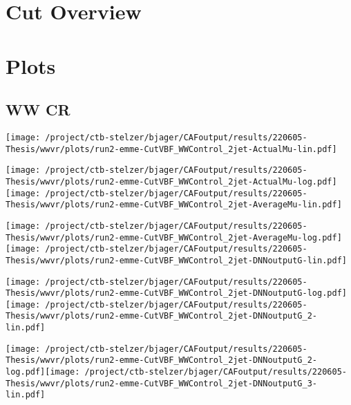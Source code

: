 \documentclass{article}
\begin{document}
\section[Cut Overview]{Cut Overview}

\centering


\section[Plots]{Plots}

\centering

\subsection[WW CR]{WW CR}

\centering

\texttt{[image: /project/ctb-stelzer/bjager/CAFoutput/results/220605-Thesis/wwvr/plots/run2-emme-CutVBF\_WWControl\_2jet-ActualMu-lin.pdf]}

\texttt{[image: /project/ctb-stelzer/bjager/CAFoutput/results/220605-Thesis/wwvr/plots/run2-emme-CutVBF\_WWControl\_2jet-ActualMu-log.pdf]}\texttt{[image: /project/ctb-stelzer/bjager/CAFoutput/results/220605-Thesis/wwvr/plots/run2-emme-CutVBF\_WWControl\_2jet-AverageMu-lin.pdf]}

\texttt{[image: /project/ctb-stelzer/bjager/CAFoutput/results/220605-Thesis/wwvr/plots/run2-emme-CutVBF\_WWControl\_2jet-AverageMu-log.pdf]}\texttt{[image: /project/ctb-stelzer/bjager/CAFoutput/results/220605-Thesis/wwvr/plots/run2-emme-CutVBF\_WWControl\_2jet-DNNoutputG-lin.pdf]}

\texttt{[image: /project/ctb-stelzer/bjager/CAFoutput/results/220605-Thesis/wwvr/plots/run2-emme-CutVBF\_WWControl\_2jet-DNNoutputG-log.pdf]}\texttt{[image: /project/ctb-stelzer/bjager/CAFoutput/results/220605-Thesis/wwvr/plots/run2-emme-CutVBF\_WWControl\_2jet-DNNoutputG\_2-lin.pdf]}

\texttt{[image: /project/ctb-stelzer/bjager/CAFoutput/results/220605-Thesis/wwvr/plots/run2-emme-CutVBF\_WWControl\_2jet-DNNoutputG\_2-log.pdf]}\texttt{[image: /project/ctb-stelzer/bjager/CAFoutput/results/220605-Thesis/wwvr/plots/run2-emme-CutVBF\_WWControl\_2jet-DNNoutputG\_3-lin.pdf]}
\end{document}
